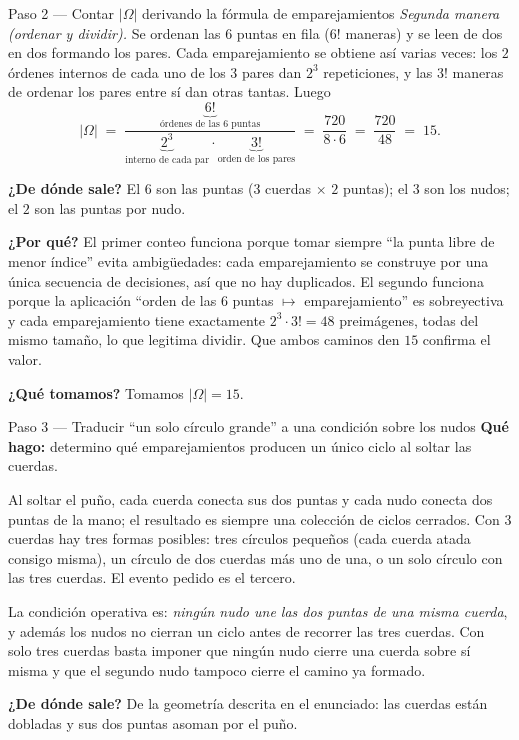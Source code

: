 \documentclass[11pt]{article}
\begin{document}
\begin{sol}
\begin{paso}{Paso 2 --- Contar $|\Omega|$ derivando la f\'ormula de emparejamientos}
\emph{Segunda manera (ordenar y dividir).} Se ordenan las $6$ puntas en fila ($6!$ maneras) y se leen de dos en dos formando los pares. Cada emparejamiento se obtiene as\'i varias veces: los $2$ \'ordenes internos de cada uno de los $3$ pares dan $2^{3}$ repeticiones, y las $3!$ maneras de ordenar los pares entre s\'i dan otras tantas. Luego
\[
|\Omega| \;=\; \frac{\underbrace{6!}_{\text{\'ordenes de las 6 puntas}}}{\underbrace{2^{3}}_{\text{interno de cada par}}\cdot\underbrace{3!}_{\text{orden de los pares}}}
\;=\;\frac{720}{8\cdot 6}\;=\;\frac{720}{48}\;=\;15 .
\]

\textbf{¿De d\'onde sale?} El $6$ son las puntas ($3$ cuerdas $\times$ $2$ puntas); el $3$ son los nudos; el $2$ son las puntas por nudo.

\textbf{¿Por qu\'e?} El primer conteo funciona porque tomar siempre ``la punta libre de menor \'indice'' evita ambig\"uedades: cada emparejamiento se construye por una \'unica secuencia de decisiones, as\'i que no hay duplicados. El segundo funciona porque la aplicaci\'on ``orden de las $6$ puntas $\mapsto$ emparejamiento'' es sobreyectiva y cada emparejamiento tiene exactamente $2^{3}\cdot 3!=48$ preim\'agenes, todas del mismo tama\~no, lo que legitima dividir. Que ambos caminos den $15$ confirma el valor.

\textbf{¿Qu\'e tomamos?} Tomamos $|\Omega|=15$.
\end{paso}

\begin{paso}{Paso 3 --- Traducir ``un solo c\'irculo grande'' a una condici\'on sobre los nudos}
\textbf{Qu\'e hago:} determino qu\'e emparejamientos producen un \'unico ciclo al soltar las cuerdas.

Al soltar el pu\~no, cada cuerda conecta sus dos puntas y cada nudo conecta dos puntas de la mano; el resultado es siempre una colecci\'on de ciclos cerrados. Con $3$ cuerdas hay tres formas posibles: tres c\'irculos peque\~nos (cada cuerda atada consigo misma), un c\'irculo de dos cuerdas m\'as uno de una, o un solo c\'irculo con las tres cuerdas. El evento pedido es el tercero.

La condici\'on operativa es: \emph{ning\'un nudo une las dos puntas de una misma cuerda}, y adem\'as los nudos no cierran un ciclo antes de recorrer las tres cuerdas. Con solo tres cuerdas basta imponer que ning\'un nudo cierre una cuerda sobre s\'i misma y que el segundo nudo tampoco cierre el camino ya formado.

\textbf{¿De d\'onde sale?} De la geometr\'ia descrita en el enunciado: las cuerdas est\'an dobladas y sus dos puntas asoman por el pu\~no.


\end{paso}
\end{sol}
\end{document}
